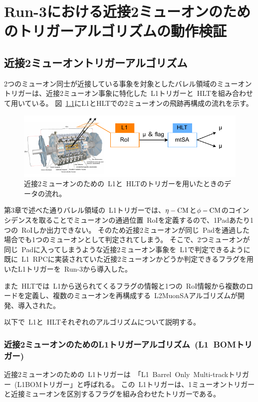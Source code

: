 \chapter{Run-3における近接2ミューオンのためのトリガーアルゴリズムの動作検証}\label{chapter4}

\section{近接2ミューオントリガーアルゴリズム}\label{chapter4-1}
2つのミューオン同士が近接している事象を対象としたバレル領域のミューオントリガーは、近接2ミューオン事象に特化した~L1トリガーと~HLTを組み合わせて用いている。
図~\ref{fig:4-1}にL1とHLTでの2ミューオンの飛跡再構成の流れを示す。

\begin{figure}[H]
    \centering
    \includegraphics[clip, width=13cm]{fig/4/closebyMuonFlow.pdf}
    \caption{近接2ミューオンのための~L1と~HLTのトリガーを用いたときのデータの流れ。}
    \label{fig:4-1}
\end{figure}

第3章で述べた通りバレル領域の~L1トリガーでは、$\eta-\rm{CM}$と$\phi-\rm{CM}$のコインシデンスを取ることでミューオンの通過位置~RoIを定義するので、1Padあたり1つの~RoIしか出力できない。
そのため近接2ミューオンが同じ~Padを通過した場合でも1つのミューオンとして判定されてしまう。
そこで、2つミューオンが同じ~Padに入ってしまうような近接2ミューオン事象を~L1で判定できるように既に~L1~RPCに実装されていた近接2ミューオンかどうか判定できるフラグを用いたL1トリガーを~Run-3から導入した。

また~HLTでは~L1から送られてくるフラグの情報と1つの~RoI情報から複数のロードを定義し、複数のミューオンを再構成する~L2MuonSAアルゴリズムが開発、導入された。

以下で~L1と~HLTそれぞれのアルゴリズムについて説明する。

\newpage

\subsection{近接2ミューオンのためのL1トリガーアルゴリズム~(L1~BOMトリガー)}\label{chapter4-1-1}
近接2ミューオンのための~L1トリガーは~「L1~Barrel~Only~Multi-trackトリガー~(L1BOMトリガー」と呼ばれる。
この~L1トリガーは、1ミューオントリガーと近接ミューオンを区別するフラグを組み合わせたトリガーである。

